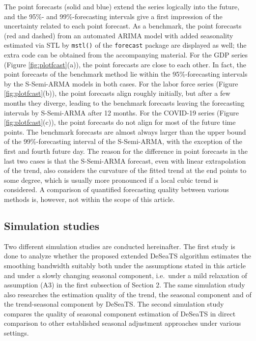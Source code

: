 \noindent
The point forecasts (solid and blue) extend the series logically into the future, and the 95\%- and 99\%-forecasting intervals give a first impression of the uncertainty related to each point forecast. As a benchmark, the point forecasts (red and dashed) from an automated ARIMA model with added seasonality estimated via STL by \texttt{mstl()} of the \texttt{forecast} package are displayed as well; the extra code can be obtained from the accompanying material. For the GDP series (Figure \ref{fig:plotfcast}(a)), the point forecasts are close to each other. In fact, the point forecasts of the benchmark method lie within the 95\%-forecasting intervals by the S-Semi-ARMA models in both cases. For the labor force series (Figure \ref{fig:plotfcast}(b)), the point forecasts align roughly initially, but after a few months they diverge, leading to the benchmark forecasts leaving the forecasting intervals by S-Semi-ARMA after 12 months. For the COVID-19 series (Figure \ref{fig:plotfcast}(c)), the point forecasts do not align for most of the future time points. The benchmark forecasts are almost always larger than the upper bound of the 99\%-forecasting interval of the S-Semi-ARMA, with the exception of the first and fourth future day. The reason for the difference in point forecasts in the last two cases is that the S-Semi-ARMA forecast, even with linear extrapolation of the trend, also considers the curvature of the fitted trend at the end points to some degree, which is usually more pronounced if a local cubic trend is considered. A comparison of quantified forecasting quality between various methods is, however, not within the scope of this article.

\subsection{Simulation studies}\label{sec:simstudy}

Two different simulation studies are conducted hereinafter. The first study is done to analyze whether the proposed extended DeSeaTS algorithm estimates the smoothing bandwidth suitably both under the assumptions stated in this article and under a slowly changing seasonal component, i.e.~under a mild relaxation of assumption (A3) in the first subsection of Section 2. The same simulation study also researches the estimation quality of the trend, the seasonal component and of the trend-seasonal component by DeSeaTS. The second simulation study compares the quality of seasonal component estimation of DeSeaTS in direct comparison to other established seasonal adjustment approaches under various settings.

